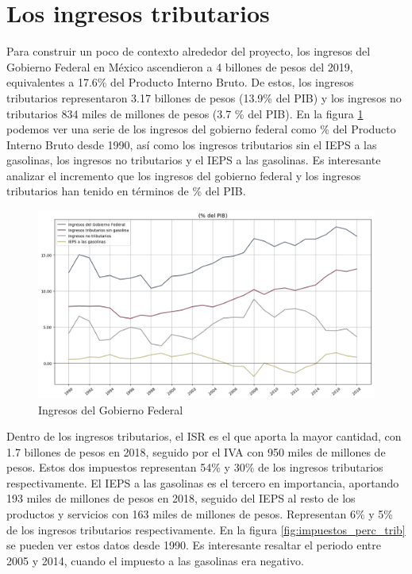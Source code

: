 \documentclass[a4paper, 11pt]{article}
\begin{document}
\section*{Los ingresos tributarios}
Para construir un poco de contexto alrededor del proyecto, los ingresos del Gobierno Federal en México ascendieron a 4 billones de pesos del 2019, equivalentes a 17.6\% del Producto Interno Bruto. De estos, los ingresos tributarios representaron 3.17 billones de pesos (13.9\% del PIB) y los ingresos no tributarios 834 miles de millones de pesos (3.7 \% del PIB).  En la figura \ref{fig:ing_gob_fed} podemos ver una serie de los ingresos del gobierno federal como \% del Producto Interno Bruto desde 1990, así como los ingresos tributarios sin el IEPS a las gasolinas, los ingresos no tributarios y el IEPS a las gasolinas. Es interesante analizar el incremento que los ingresos del gobierno federal y los ingresos tributarios han tenido en términos de \% del PIB.

\begin{figure}[hbt!]
    \centering
     \caption{Ingresos del Gobierno Federal}
     \label{fig:ing_gob_fed}
     \includegraphics[scale = 0.4]{figures/ingresos_gob_fed}
\end{figure}
Dentro de los ingresos tributarios, el ISR es el que aporta la mayor cantidad, con 1.7 billones de pesos en 2018, seguido por el IVA con 950 miles de millones de pesos. Estos dos impuestos representan 54\% y 30\% de los ingresos tributarios respectivamente. El IEPS a las gasolinas es el tercero en importancia, aportando 193 miles de millones de pesos en 2018, seguido del IEPS al resto de los productos y servicios con 163 miles de millones de pesos. Representan 6\% y 5\% de los ingresos tributarios respectivamente. En la figura \ref{fig:impuestos_perc_trib} se pueden ver estos datos desde 1990. Es interesante resaltar el periodo entre 2005 y 2014, cuando el impuesto a las gasolinas era negativo.
\end{document}
